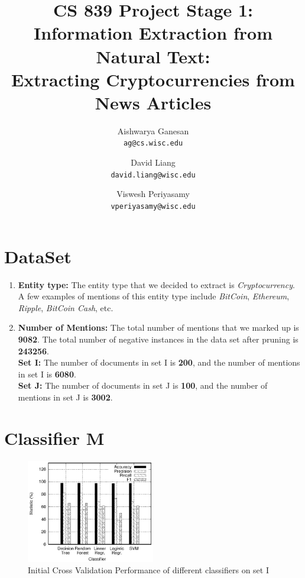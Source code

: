 \documentclass[12pt,letterpaper]{article}
\begin{document}
\title{CS 839 Project Stage 1: Information Extraction from Natural Text: \\Extracting Cryptocurrencies from News Articles}

\author{Aishwarya Ganesan\\
{\tt ag@cs.wisc.edu}
\and
David Liang\\
{\tt david.liang@wisc.edu}
\and 
Viswesh Periyasamy\\
{\tt vperiyasamy@wisc.edu}
}

\maketitle

\section*{DataSet}
\begin{enumerate}
\item \textbf{Entity type:} The entity type that we decided to extract is \textit{Cryptocurrency}. A few examples of mentions of this entity type include \textit{BitCoin}, \textit{Ethereum}, \textit{Ripple}, \textit{BitCoin Cash}, etc.
\item \textbf{Number of Mentions:} The total number of mentions that we marked up is \textbf{9082}. The total number of negative instances in the data set after pruning is \textbf{243256}.\\
\textbf{Set I:} The number of documents in set I is \textbf{200}, and the number of mentions in set I is \textbf{6080}. \\
\textbf{Set J:} The number of documents in set J is \textbf{100}, and the number of mentions in set J is \textbf{3002}. 
\end{enumerate}
 
\section*{Classifier M}
\begin{figure}[h!]
\centering
\includegraphics[width=0.5\textwidth]{M_I}
\caption{Initial Cross Validation Performance of different classifiers on set I}
\label{fig1}
\end{figure}
\end{document}
